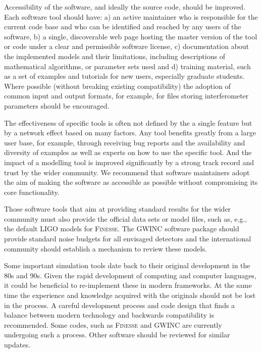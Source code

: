 Accessibility of the software, and ideally the source code, should be improved. Each software tool should have: a) an active maintainer who is responsible for the current code base and who can be identified and reached by any users of the software, b) a single, discoverable web page hosting the master version of the tool or code under a clear and permissible software license, c) documentation about the implemented models and their limitations, including descriptions of mathematical algorithms, or parameter sets used and d) training material, such as a set of examples and tutorials for new users, especially graduate students. Where possible (without breaking existing compatibility) the adoption of common input and output formats, for example, for files storing interferometer parameters should be encouraged.

The effectiveness of specific tools is often not defined by the a single feature but by a network effect based on many factors. Any tool benefits greatly from a large user base, for example, through receiving bug reports and the availability and diversity of examples as well as experts on how to use the specific tool. And the impact of a modelling tool is improved significantly by a strong track record and trust by the wider community. We recommend that software maintainers adopt the aim of making the software as accessible as possible without compromising its core functionality. %

Those software tools that aim at providing standard results for the wider community must also provide the official data sets or model files, such as, e.g., the default \ac{LIGO}  models for \textsc{Finesse}. The \ac{GWINC}  software package should provide standard noise budgets for all envisaged detectors and the
international community should establish a mechanism to review these models.

Some important simulation tools date back to their original development in the 80s and 90s. Given the rapid development of computing and computer languages, it could be beneficial to re-implement these in modern frameworks. At the same time the experience and knowledge acquired with the originals should not be lost in the process. A careful development process and code design that finds a balance between modern technology and backwards compatibility
is recommended. Some codes, such as \textsc{Finesse} and \ac{GWINC}  are currently undergoing such a process. Other software should be reviewed for similar updates.

